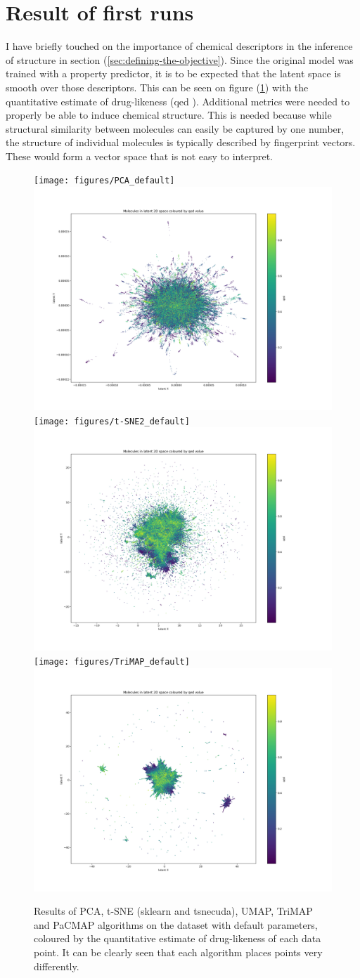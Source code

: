 \section{Result of first runs}\label{sec:result-of-first-runs}

I have briefly touched on the importance of chemical descriptors in the inference of structure in section (\ref{sec:defining-the-objective}). Since the original model was trained with a property predictor, it is to be expected that the latent space is smooth over those descriptors. This can be seen on figure (\ref{fig:default_run}) with the quantitative estimate of drug-likeness (qed \cite{bib:qed}). Additional metrics were needed to properly be able to induce chemical structure. This is needed because while structural similarity between molecules can easily be captured by one number, the structure of individual molecules is typically described by fingerprint vectors. These would form a vector space that is not easy to interpret.

\begin{figure}[!ht]
	\centering
	\texttt{[image: figures/PCA\_default]}
	\includegraphics[width=0.49\columnwidth, keepaspectratio]{figures/t-SNE_default}
	\texttt{[image: figures/t-SNE2\_default]}
	\includegraphics[width=0.49\columnwidth, keepaspectratio]{figures/UMAP_default}
	\texttt{[image: figures/TriMAP\_default]}
	\includegraphics[width=0.49\columnwidth, keepaspectratio]{figures/PaCMAP_default}
	\caption{Results of PCA, t-SNE (sklearn and tsnecuda), UMAP, TriMAP and PaCMAP algorithms on the dataset with default parameters, coloured by the quantitative estimate of drug-likeness of each data point. It can be clearly seen that each algorithm places points very differently.}
	\label{fig:default_run}
\end{figure}

